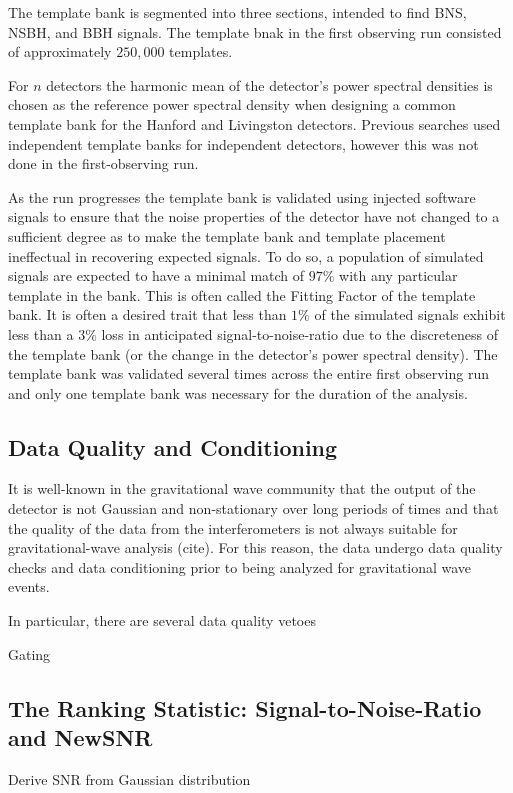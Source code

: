 The template bank is segmented into three sections, intended to find BNS, NSBH, and BBH signals. 
The template bnak in the first observing run consisted of approximately $250,000$ templates.

For $n$ detectors the harmonic mean of the detector's power spectral densities is chosen as the reference power spectral density when designing a common template bank for the Hanford and Livingston detectors. Previous searches used independent template banks for independent detectors, however this was not done in the first-observing run.

As the run progresses the template bank is validated using injected software signals to ensure that the noise properties of the detector have not changed to a sufficient degree as to make the template bank and template placement ineffectual in recovering expected signals. To do so, a population of simulated signals are expected to have a minimal match of $97 \%$ with any particular template in the bank. This is often called the Fitting Factor of the template bank. It is often a desired trait that less than $1\%$ of the simulated signals exhibit less than a $3 \%$ loss in anticipated signal-to-noise-ratio due to the discreteness of the template bank (or the change in the detector's power spectral density). The template bank was validated several times across the entire first observing run and only one template bank was necessary for the duration of the analysis.

\subsection{Data Quality and Conditioning}
It is well-known in the gravitational wave community that the output of the detector is not Gaussian and non-stationary over long periods of times and that the quality of the data from the interferometers is not always suitable for gravitational-wave analysis (cite). For this reason, the data undergo data quality checks and data conditioning prior to being analyzed for gravitational wave events.

In particular, there are several data quality vetoes

Gating

\subsection{The Ranking Statistic: Signal-to-Noise-Ratio and NewSNR}
Derive SNR from Gaussian distribution

